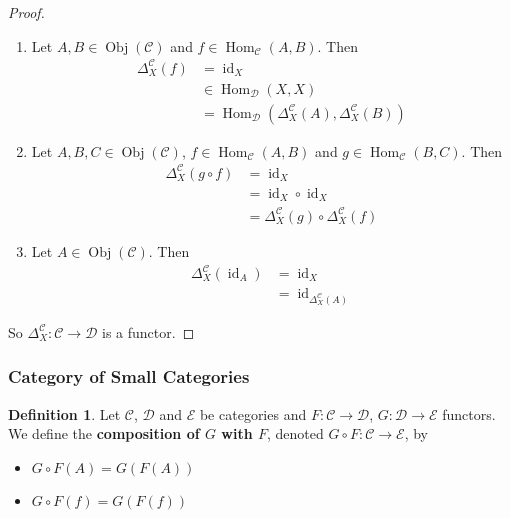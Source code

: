 \documentclass[12pt]{amsart}
\theoremstyle{definition}
\newtheorem{defn}[definition]{Definition}
\newcommand{\Del}{\Delta}
\newcommand{\MC}{\mathcal{C}}
\newcommand{\MD}{\mathcal{D}}
\newcommand{\ME}{\mathcal{E}}
\DeclareMathOperator{\id}{id}
\DeclareMathOperator{\Obj}{Obj}
\DeclareMathOperator{\Hom}{Hom}
\DeclareMathOperator*{\0}{\mbf{0}}
\DeclareMathOperator*{\1}{\mbf{1}}
\newcommand{\ld}[1]{\label{defn:#1}}
\begin{document}
	\begin{proof}\
		\begin{enumerate}
			\item Let $A, B \in \Obj(\MC)$ and $f \in \Hom_{\MC}(A, B)$. Then 
			\begin{align*}
				\Del^{\MC}_X (f)
				& = \id_X \\
				& \in \Hom_{\MD}(X, X) \\
				& = \Hom_{\MD}(\Del^{\MC}_X (A), \Del^{\MC}_X (B))
			\end{align*}  
			\item Let $A,B,C \in \Obj(\MC)$, $f \in \Hom_{\MC}(A, B)$ and $g \in \Hom_{\MC}(B, C)$. Then 
			\begin{align*}
				\Del^{\MC}_X (g \circ f) 
				& = \id_X \\
				& = \id_X \circ \id_X \\
				& = \Del^{\MC}_X (g) \circ \Del^{\MC}_X (f)
			\end{align*} 
			\item Let $A \in \Obj(\MC)$. Then 
			\begin{align*}
				\Del^{\MC}_X (\id_A)
				& = \id_X \\
				& = \id_{\Del^{\MC}_X (A)}
			\end{align*}
		\end{enumerate}
		So $\Del^{\MC}_X : \MC \rightarrow \MD$ is a functor.
	\end{proof}


















	\subsubsection{Category of Small Categories}

	\begin{defn} \ld{13006}
		Let $\MC$, $\MD$ and $\ME$ be categories and $F:\MC \rightarrow \MD$, $G: \MD \rightarrow \ME$ functors. We define the \textbf{composition of $G$ with $F$}, denoted $G \circ F: \MC \rightarrow \ME$, by 
		\begin{itemize}
			\item $G \circ F (A) = G(F(A))$
			\item $G \circ F (f) = G(F(f))$
		\end{itemize} 
	\end{defn}
	
\end{document}

